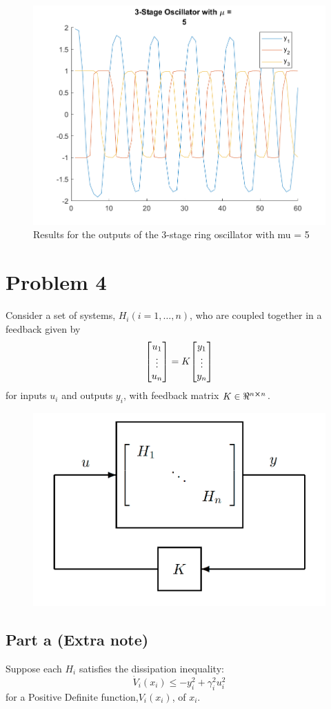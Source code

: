 \documentclass[letter]{article}
\begin{document}
\begin{figure}[p]
	\centering
	\includegraphics[width=0.7\linewidth]{fig/HW6_pblm3_results_mu_5}
	\caption{Results for the outputs of the 3-stage ring oscillator with mu = 5}
	\label{fig:pblm3_mu5}
\end{figure}




\newpage
\newpage
\section{Problem 4}
Consider a set of systems, $H_i (i=1,\dots,n)$, who are coupled together in a feedback given by
$$\mqty[u_1\\ \vdots \\ u_n] = K \mqty[y_1\\ \vdots \\ y_n]$$
for inputs $u_i$ and outputs $y_i$, with feedback matrix $K \in \real^{n\cross n}$.

\begin{figure}[h]
	\centering
	\includegraphics[width=0.5\linewidth]{fig/pblm4_given_fig}
	\label{fig:pblm4givenfig}
\end{figure}

\subsection{Part a (Extra note)}
Suppose each $H_i$ satisfies the dissipation inequality:
$$\dot{V}_i(x_i) \leq -y_i^2 + \gamma_i^2 u_i^2$$
for a Positive Definite function,$V_i(x_i)$, of $x_i$.\\
\end{document}
